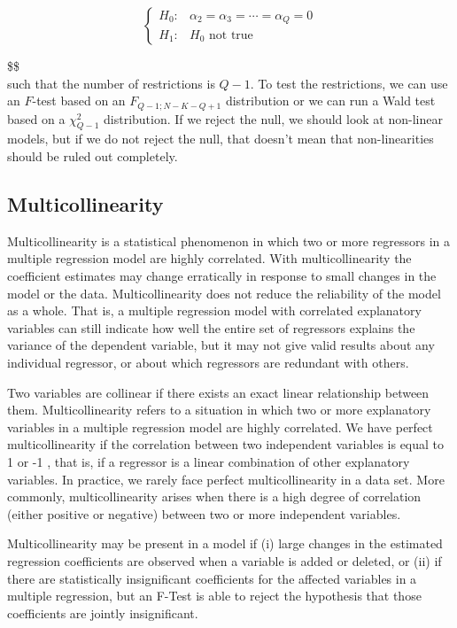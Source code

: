 \[
\begin{cases}H_{0}: & \alpha_{2}=\alpha_{3}=\cdots=\alpha_{Q}=0 \\ H_{1}: & H_{0} \text { not true }\end{cases}
\]

\$\$\\
such that the number of restrictions is $Q-1$. To test the restrictions, we can use an $F$-test based on an $F_{Q-1 ; N-K-Q+1}$ distribution or we can run a Wald test based on a $\chi_{Q-1}^{2}$ distribution. If we reject the null, we should look at non-linear models, but if we do not reject the null, that doesn't mean that non-linearities should be ruled out completely.

\subsection{Multicollinearity}
Multicollinearity is a statistical phenomenon in which two or more regressors in a multiple regression model are highly correlated. With multicollinearity the coefficient estimates may change erratically in response to small changes in the model or the data. Multicollinearity does not reduce the reliability of the model as a whole. That is, a multiple regression model with correlated explanatory variables can still indicate how well the entire set of regressors explains the variance of the dependent variable, but it may not give valid results about any individual regressor, or about which regressors are redundant with others.

Two variables are collinear if there exists an exact linear relationship between them. Multicollinearity refers to a situation in which two or more explanatory variables in a multiple regression model are highly correlated. We have perfect multicollinearity if the correlation between two independent variables is equal to 1 or -1 , that is, if a regressor is a linear combination of other explanatory variables. In practice, we rarely face perfect multicollinearity in a data set. More commonly, multicollinearity arises when there is a high degree of correlation (either positive or negative) between two or more independent variables.

Multicollinearity may be present in a model if (i) large changes in the estimated regression coefficients are observed when a variable is added or deleted, or (ii) if there are statistically insignificant coefficients for the affected variables in a multiple regression, but an F-Test is able to reject the hypothesis that those coefficients are jointly insignificant.

